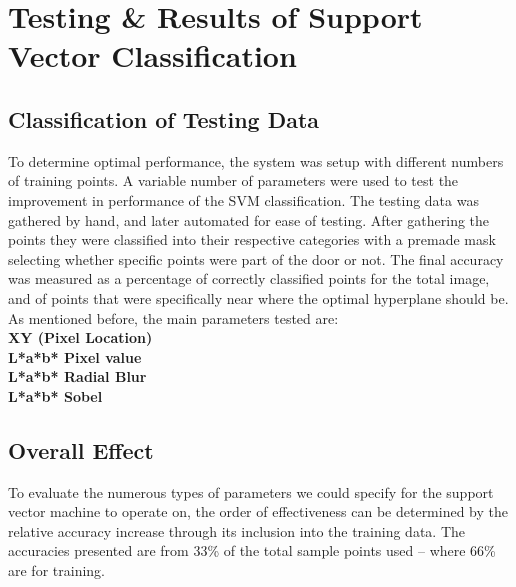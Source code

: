\chapter {Testing \& Results of Support Vector Classification}

\section{Classification of Testing Data}
To determine optimal performance, the system was setup with different numbers of training points. A variable number of parameters were used to test the improvement in performance of the SVM classification. The testing data was gathered by hand, and later automated for ease of testing. After gathering the points they were classified into their respective categories with a premade mask selecting whether specific points were part of the door or not. The final accuracy was measured as a percentage of correctly classified points for the total image, and of points that were specifically near where the optimal hyperplane should be. As mentioned before, the main parameters tested are:\\ 
\textbf{XY (Pixel Location)}\\
\textbf{L*a*b* Pixel value} \\
\textbf{L*a*b* Radial Blur} \\
\textbf{L*a*b* Sobel} 
\section{Overall Effect}
To evaluate the numerous types of parameters we could specify for the support vector machine to operate on, the order of effectiveness can be determined by the relative accuracy increase through its inclusion into the training data. The accuracies presented are from 33\% of the total sample points used -- where 66\% are for training. \newpage


